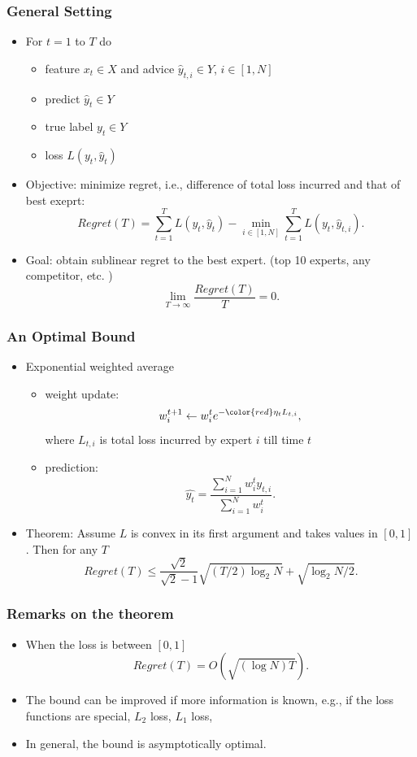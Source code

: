 \documentclass{beamer}
\begin{document}
\begin{frame}
\frametitle{General Setting}
\begin{itemize}
\item{For $t = 1$ to $T$ do}
	\begin{itemize}
	\item{feature $x_t\in X$ and advice $\hat{y}_{t,i}\in Y$, $i\in [1,N]$}
	\item{predict $\hat{y}_t\in Y$}
	\item{true label $y_t\in Y$}
	\item{loss $L(y_t,\hat{y}_t)$}
	\end{itemize}
\pause
\item {\color{red}Objective:} minimize regret, i.e., difference of total loss incurred and that of best exeprt:
$$Regret(T) = \sum_{t=1}^TL(y_t,\hat{y}_t)-\min_{i\in[1,N]}\sum_{t=1}^TL(y_t,\hat{y}_{t,i}).$$
\pause	
\item Goal: obtain {\color{red}sublinear regret} to the {\color{red}best expert}. (top 10 experts, any competitor, etc. )
$$\lim_{T\to \infty}\frac{Regret(T)}{T} = 0.$$
\end{itemize}


\end{frame}

\begin{frame}
\frametitle{An Optimal Bound}
\begin{itemize}
\item Exponential weighted average

\begin{itemize}
\item weight update:
$$w_i^{t+1} \leftarrow w_i^t e^{-{\color{red}\eta_t} L_{t,i}},$$
where $L_{t,i}$ is total loss incurred by expert $i$ till time $t$
\item prediction:
$$\hat{y_t} = \frac{\sum_{i=1}^Nw_{i}^ty_{t,i}}{\sum_{i=1}^Nw_{i}^t}.$$ 
\end{itemize}
\pause
\item Theorem: Assume $L$ is convex in its first argument and takes values in $[0,1]$. Then for any $T$
$$Regret(T)\le \frac{\sqrt{2}}{\sqrt{2}-1}\sqrt{(T/2)\log_2 N}+\sqrt{\log_2 N/2}.$$


\end{itemize}


\end{frame}
\begin{frame}
\frametitle{Remarks on the theorem}
\begin{itemize}
\item When the loss is between $[0,1]$ 
$$Regret(T) = O(\sqrt{(\log N) T}).$$
\pause
\item The bound can be improved if more information is known, e.g., if the loss functions are special, $L_2$ loss, $L_1$ loss, 
\pause
\item In general, the bound is asymptotically optimal. 

\end{itemize}


\end{frame}
\end{document}
